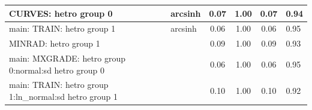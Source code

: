 \begin{table}
\begin{center}
\begin{tabular}{|l|l|c|c|c|l|}
			\hline
			CURVES: hetro group 0 & arcsinh & 0.07 & 1.00 & 0.07 & 0.94 \\
			\hline
			main: TRAIN: hetro group 1 & arcsinh & 0.06 & 1.00 & 0.06 & 0.95 \\
			\hline
			MINRAD: hetro group 1 &  & 0.09 & 1.00 & 0.09 & 0.93 \\
			\hline
			main: MXGRADE: hetro group 0:normal:sd  hetro group 0 &  & 0.06 & 1.00 & 0.06 & 0.95 \\
			\hline
			main: TRAIN: hetro group 1:ln_normal:sd  hetro group 1 &  & 0.10 & 1.00 & 0.10 & 0.92 \\
			\hline
		\end{tabular}
	\end{center}
\end{table}